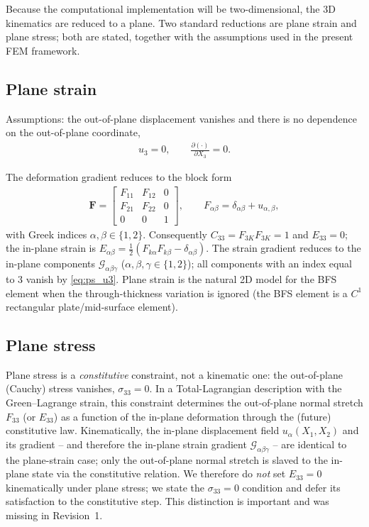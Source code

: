 \documentclass[11pt]{article}
\newcommand{\bF}{\mathbf{F}}
\newcommand{\bF}{\mathbf{F}}
\begin{document}
Because the computational implementation will be two-dimensional, the
3D kinematics are reduced to a plane. Two standard reductions are
plane strain and plane stress; both are stated, together with the
assumptions used in the present FEM framework.

\subsection{Plane strain}

Assumptions: the out-of-plane displacement vanishes and there is no
dependence on the out-of-plane coordinate,
\begin{align}
u_{3}=0,\qquad \frac{\partial(\cdot)}{\partial X_{3}}=0.
\label{eq:ps_u3}
\end{align}

The deformation gradient reduces to the block form
\begin{align}
\bF =
\begin{bmatrix}
F_{11} & F_{12} & 0\\
F_{21} & F_{22} & 0\\
0      & 0      & 1
\end{bmatrix},
\qquad F_{\alpha\beta}=\delta_{\alpha\beta}+u_{\alpha,\beta},
\label{eq:ps_F}
\end{align}
with Greek indices $\alpha,\beta\in\{1,2\}$. Consequently
$C_{33}=F_{3K}F_{3K}=1$ and $E_{33}=0$; the in-plane strain is
$E_{\alpha\beta}=\tfrac12(F_{k\alpha}F_{k\beta}-\delta_{\alpha\beta})$.
The strain gradient reduces to the in-plane components
$\mathcal{G}_{\alpha\beta\gamma}$ ($\alpha,\beta,\gamma\in\{1,2\}$); all
components with an index equal to $3$ vanish by
\eqref{eq:ps_u3}. Plane
strain is the natural 2D model for the BFS element when the
through-thickness variation is ignored (the BFS element is a
$C^{1}$ rectangular plate/mid-surface element).

\subsection{Plane stress}

Plane stress is a \emph{constitutive} constraint, not a kinematic one:
the out-of-plane (Cauchy) stress vanishes, $\sigma_{33}=0$. In a
Total-Lagrangian description with the Green--Lagrange strain, this
constraint determines the out-of-plane normal stretch $F_{33}$ (or
$E_{33}$) as a function of the in-plane deformation through the (future)
constitutive law. Kinematically, the in-plane displacement field
$u_{\alpha}(X_{1},X_{2})$ and its gradient -- and therefore the
in-plane strain gradient $\mathcal{G}_{\alpha\beta\gamma}$ -- are identical to
the plane-strain case; only the out-of-plane normal stretch is slaved
to the in-plane state via the constitutive relation. We therefore do
\emph{not} set $E_{33}=0$ kinematically under plane stress; we state
the $\sigma_{33}=0$ condition and defer its satisfaction to the
constitutive step. This distinction is important and was missing in
Revision~1.
\end{document}
